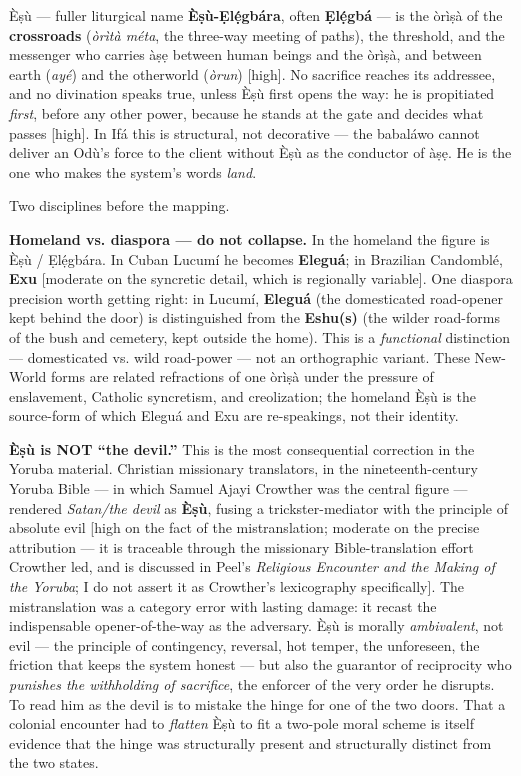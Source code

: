 \documentclass[11pt]{article}
\begin{document}
Èṣù — fuller liturgical name \textbf{Èṣù-Ẹlẹ́gbára}, often \textbf{Ẹlẹ́gbá} — is the òrìṣà of the \textbf{crossroads} (\emph{òrìtà méta}, the three-way meeting of paths), the threshold, and the messenger who carries àṣẹ between human beings and the òrìṣà, and between earth (\emph{ayé}) and the otherworld (\emph{òrun}) [high]. No sacrifice reaches its addressee, and no divination speaks true, unless Èṣù first opens the way: he is propitiated \emph{first}, before any other power, because he stands at the gate and decides what passes [high]. In Ifá this is structural, not decorative — the babaláwo cannot deliver an Odù's force to the client without Èṣù as the conductor of àṣẹ. He is the one who makes the system's words \emph{land}.

Two disciplines before the mapping.

\textbf{Homeland vs. diaspora — do not collapse.} In the homeland the figure is Èṣù /\allowbreak{} Ẹlẹ́gbára. In Cuban Lucumí he becomes \textbf{Eleguá}; in Brazilian Candomblé, \textbf{Exu} [moderate on the syncretic detail, which is regionally variable]. One diaspora precision worth getting right: in Lucumí, \textbf{Eleguá} (the domesticated road-opener kept behind the door) is distinguished from the \textbf{Eshu(s)} (the wilder road-forms of the bush and cemetery, kept outside the home). This is a \emph{functional} distinction — domesticated vs. wild road-power — not an orthographic variant. These New-World forms are related refractions of one òrìṣà under the pressure of enslavement, Catholic syncretism, and creolization; the homeland Èṣù is the source-form of which Eleguá and Exu are re-speakings, not their identity.

\textbf{Èṣù is NOT ``the devil.''} This is the most consequential correction in the Yoruba material. Christian missionary translators, in the nineteenth-century Yoruba Bible — in which Samuel Ajayi Crowther was the central figure — rendered \emph{Satan/\allowbreak{}the devil} as \textbf{Èṣù}, fusing a trickster-mediator with the principle of absolute evil [high on the fact of the mistranslation; moderate on the precise attribution — it is traceable through the missionary Bible-translation effort Crowther led, and is discussed in Peel's \emph{Religious Encounter and the Making of the Yoruba}; I do not assert it as Crowther's lexicography specifically]. The mistranslation was a category error with lasting damage: it recast the indispensable opener-of-the-way as the adversary. Èṣù is morally \emph{ambivalent}, not evil — the principle of contingency, reversal, hot temper, the unforeseen, the friction that keeps the system honest — but also the guarantor of reciprocity who \emph{punishes the withholding of sacrifice}, the enforcer of the very order he disrupts. To read him as the devil is to mistake the hinge for one of the two doors. That a colonial encounter had to \emph{flatten} Èṣù to fit a two-pole moral scheme is itself evidence that the hinge was structurally present and structurally distinct from the two states.
\end{document}
